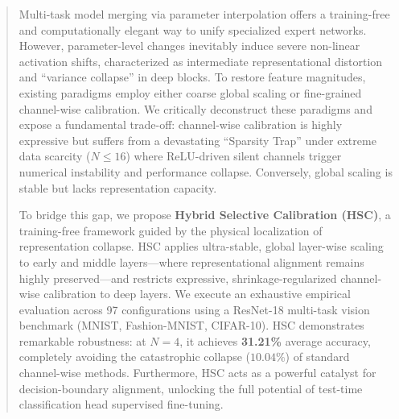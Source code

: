 \documentclass{article}
\begin{document}

\printAffiliationsAndNotice{}

\begin{abstract}
Multi-task model merging via parameter interpolation offers a training-free and computationally elegant way to unify specialized expert networks. However, parameter-level changes inevitably induce severe non-linear activation shifts, characterized as intermediate representational distortion and ``variance collapse'' in deep blocks. To restore feature magnitudes, existing paradigms employ either coarse global scaling or fine-grained channel-wise calibration. We critically deconstruct these paradigms and expose a fundamental trade-off: channel-wise calibration is highly expressive but suffers from a devastating ``Sparsity Trap'' under extreme data scarcity ($N \le 16$) where ReLU-driven silent channels trigger numerical instability and performance collapse. Conversely, global scaling is stable but lacks representation capacity.

To bridge this gap, we propose \textbf{Hybrid Selective Calibration (HSC)}, a training-free framework guided by the physical localization of representation collapse. HSC applies ultra-stable, global layer-wise scaling to early and middle layers—where representational alignment remains highly preserved—and restricts expressive, shrinkage-regularized channel-wise calibration to deep layers. We execute an exhaustive empirical evaluation across 97 configurations using a ResNet-18 multi-task vision benchmark (MNIST, Fashion-MNIST, CIFAR-10). HSC demonstrates remarkable robustness: at $N=4$, it achieves \textbf{31.21\%} average accuracy, completely avoiding the catastrophic collapse ($10.04\%$) of standard channel-wise methods. Furthermore, HSC acts as a powerful catalyst for decision-boundary alignment, unlocking the full potential of test-time classification head supervised fine-tuning.
\end{abstract}
\end{document}

